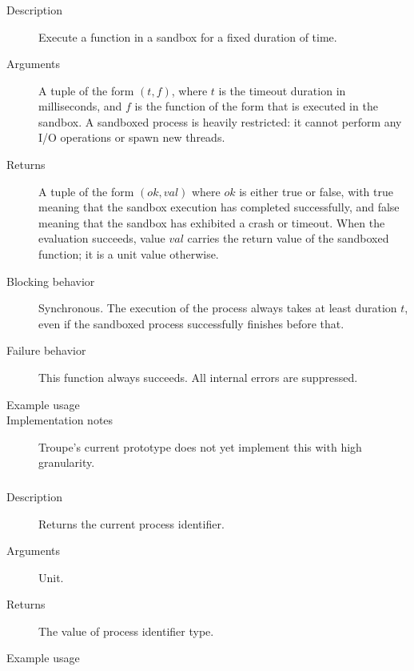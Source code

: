 \subsubsection{}
\begin{description}
    \item [Description] Execute a function in a sandbox for a fixed duration of time.
    \item [Arguments] A tuple of the form $(\mathit{t}, f)$, where $t$ is the timeout duration in milliseconds, and $f$ is the function
of the form  that is executed in the sandbox. A sandboxed process is heavily restricted: it cannot perform
any I/O operations or spawn new threads.
    \item [Returns] A tuple of the form $(\mathit{ok}, \mathit{val})$ where $\mathit{ok}$ is either true or false, with true meaning that the sandbox execution has completed successfully, and false meaning that the sandbox has exhibited a crash or timeout. When the evaluation succeeds, value $\mathit{val}$ carries the return value of the sandboxed function; it is a unit value otherwise.
    \item [Blocking behavior] Synchronous. The execution of the process always takes at least duration $\mathit{t}$, even if the sandboxed process successfully finishes before that.
    \item [Failure behavior] This function always succeeds. All internal errors are suppressed.
    \item [Example usage] 
    \item [Implementation notes] Troupe's current prototype does not yet implement this with high granularity.
\end{description}


\subsubsection{}
\begin{description}
    \item [Description] Returns the current process identifier.
    \item [Arguments] Unit.
    \item [Returns] The value of process identifier type.
    \item [Example usage] 
\end{description}


